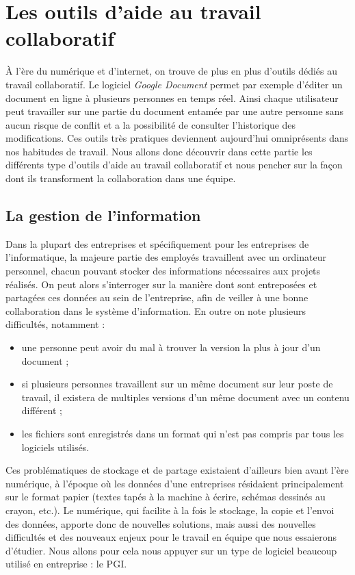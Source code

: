 \chapter{Les outils d'aide au travail collaboratif}

À l'ère du numérique et d'internet, on trouve de plus en plus d'outils dédiés au travail collaboratif. Le logiciel \textit{Google Document} permet par exemple d'éditer un document en ligne à plusieurs personnes en temps réel. Ainsi chaque utilisateur peut travailler sur une partie du document entamée par une autre personne sans aucun risque de conflit et a la possibilité de consulter l'historique des modifications. Ces outils très pratiques deviennent aujourd'hui omniprésents dans nos habitudes de travail. Nous allons donc découvrir dans cette partie les différents type d'outils d'aide au travail collaboratif et nous pencher sur la façon dont ils transforment la collaboration dans une équipe.

\section{La gestion de l'information}

Dans la plupart des entreprises et spécifiquement pour les entreprises de l'informatique, la majeure partie des employés travaillent avec un ordinateur personnel, chacun pouvant stocker des informations nécessaires aux projets réalisés. On peut alors s'interroger sur la manière dont sont entreposées et partagées ces données au sein de l'entreprise, afin de veiller à une bonne collaboration dans le système d'information. En outre on note plusieurs difficultés, notamment :

\begin{itemize}
\item une personne peut avoir du mal à trouver la version la plus à jour d'un document ;
\item si plusieurs personnes travaillent sur un même document sur leur poste de travail, il existera de multiples versions d'un même document avec un contenu différent ;
\item les fichiers sont enregistrés dans un format qui n'est pas compris par tous les logiciels utilisés.
\end{itemize}

Ces problématiques de stockage et de partage existaient d'ailleurs bien avant l'ère numérique, à l'époque où les données d'une entreprises résidaient principalement sur le format papier (textes tapés à la machine à écrire, schémas dessinés au crayon, etc.). Le numérique, qui facilite à la fois le stockage, la copie et l'envoi des données, apporte donc de nouvelles solutions, mais aussi des nouvelles difficultés et des nouveaux enjeux pour le travail en équipe que nous essaierons d'étudier. Nous allons pour cela nous appuyer sur un type de logiciel beaucoup utilisé en entreprise : le PGI.

